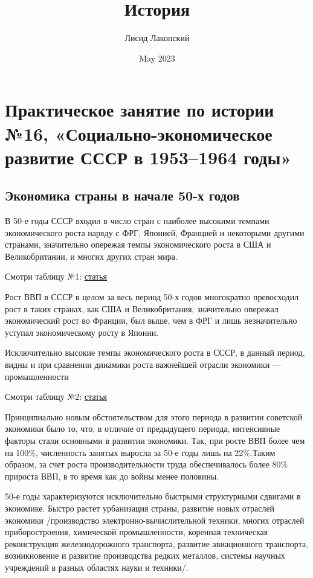 \documentclass{article}
\title{История}
\author{Лисид Лаконский}
\date{May 2023}
\begin{document}
\raggedright

\maketitle
\tableofcontents
\pagebreak

\section{Практическое занятие по истории №16, «Социально-экономическое развитие СССР в 1953–1964 годы»}

\subsection{Экономика страны в начале 50-х годов}

В 50-е годы СССР входил в число стран с наиболее высокими темпами экономического роста наряду с ФРГ, Японией, Францией и некоторыми другими странами, значительно опережая темпы экономического роста в США и Великобритании, и многих других стран мира.

Смотри таблицу №1: \href{https://istmat.org/node/57531}{статья}

\hfill

Рост ВВП в СССР в целом за весь период 50-х годов многократно превосходил рост в таких странах, как США и Великобритания, значительно опережал экономический рост во Франции, был выше, чем в ФРГ и лишь незначительно уступал экономическому росту в Японии.

Исключительно высокие темпы экономического роста в СССР, в данный период, видны и при сравнении динамики роста важнейшей отрасли экономики — промышленности

Смотри таблицу №2: \href{https://istmat.org/node/57531}{статья}

\hfill

Принципиально новым обстоятельством для этого периода в развитии советской экономики было то, что, в отличие от предыдущего периода, интенсивные факторы стали основными в развитии экономики. Так, при росте ВВП более чем на 100\%, численность занятых выросла за 50-е годы лишь на 22\%.Таким образом, за счет роста производительности труда обеспечивалось более 80\% прироста ВВП, в то время как до войны менее половины.

\hfill

50-е годы характеризуются исключительно быстрыми структурными сдвигами в экономике. Быстро растет урбанизация страны, развитие новых отраслей экономики /производство электронно-вычислительной техники, многих отраслей приборостроения, химической промышленности, коренная техническая реконструкция железнодорожного транспорта, развитие авиационного транспорта, возникновение и развитие производства редких металлов, системы научных учреждений в разных областях науки и техники/.
\end{document}
